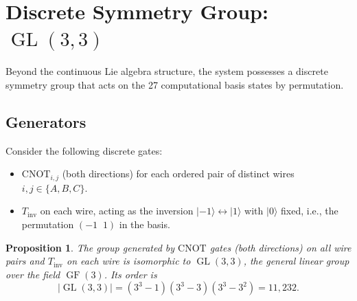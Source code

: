 \documentclass[12pt,a4paper]{article}
\newtheorem{proposition}[theorem]{Proposition}
\newcommand{\GL}{\operatorname{GL}}
\newcommand{\GF}{\operatorname{GF}}
\begin{document}
\section{Discrete Symmetry Group: $\GL(3,3)$}

\label{sec:gl33}

Beyond the continuous Lie algebra structure, the system possesses a
discrete symmetry group that acts on the 27 computational basis states
by permutation.

\subsection{Generators}

Consider the following discrete gates:
\begin{itemize}
\item $\text{CNOT}_{i,j}$ (both directions) for each ordered pair of
distinct wires $i,j \in \{A,B,C\}$.
\item $T_{\text{inv}}$ on each wire, acting as the inversion
$|{-1}\rangle \leftrightarrow |{1}\rangle$ with $|0\rangle$ fixed,
i.e., the permutation $( -1\;\;1 )$ in the basis.
\end{itemize}

\begin{proposition}
\label{prop:gl33}
The group generated by $\text{CNOT}$ gates (both directions) on all wire
pairs and $T_{\text{inv}}$ on each wire is isomorphic to
$\GL(3,3)$, the general linear group over the field $\GF(3)$. Its order
is
\[
|\GL(3,3)| = (3^3-1)(3^3-3)(3^3-3^2) = 11{,}232.
\]
\end{proposition}
\end{document}
